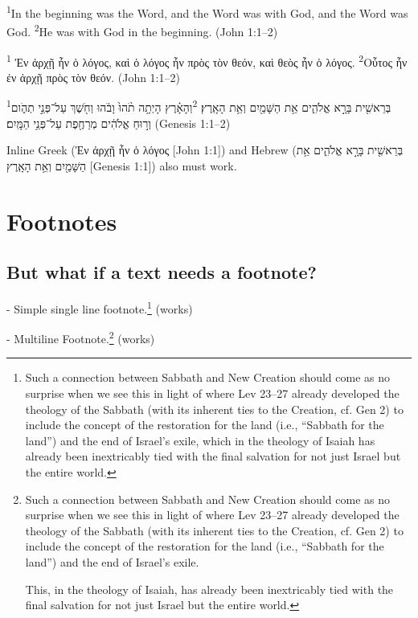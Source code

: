 \documentclass{article}
\begin{document}
	
	\textsuperscript{1}In the beginning was the Word, and the Word was with God,
	and the Word was God. \textsuperscript{2}He was with God in the beginning.
	(John 1:1–2)
	
	
	\textsuperscript{1} Ἐν ἀρχῇ ἦν ὁ λόγος, καὶ ὁ λόγος ἦν πρὸς τὸν θεόν, καὶ θεὸς
	ἦν ὁ λόγος. \textsuperscript{2}Οὗτος ἦν ἐν ἀρχῇ πρὸς τὸν θεόν.
	\foreignlanguage{british}{(John 1:1–2)}
	
	
	\textsuperscript{1}בְּרֵאשִׁ֖ית בָּרָ֣א אֱלֹהִ֑ים אֵ֥ת הַשָּׁמַ֖יִם וְאֵ֥ת הָאָֽרֶץ׃
	\textsuperscript{2}וְהָאָ֗רֶץ הָיְתָ֥ה תֹ֨הוּ֙ וָבֹ֔הוּ וְחֹ֖שֶׁךְ עַל־פְּנֵ֣י תְהֹ֑ום וְר֣וּחַ אֱלֹהִ֔ים מְרַחֶ֖פֶת
	עַל־פְּנֵ֥י הַמָּֽיִם׃ \foreignlanguage{british}{(Genesis 1:1–2)}
	
	
	Inline Greek (\foreignlanguage{polutonikogreek}{Ἐν ἀρχῇ ἦν ὁ λόγος} [John 1:1]) and
	Hebrew (\foreignlanguage{hebrew}{בְּרֵאשִׁ֖ית בָּרָ֣א אֱלֹהִ֑ים אֵ֥ת הַשָּׁמַ֖יִם וְאֵ֥ת הָאָֽרֶץ} [Genesis 1:1]) also must work.

\section{Footnotes}

\subsection{But what if a text needs a footnote?}

- Simple single line footnote.\footnote{
	Such a connection between Sabbath and New Creation should come as no surprise when we see this in light of where Lev 23--27 already developed the theology of the Sabbath (with its inherent ties to the Creation, cf. Gen 2) to include the concept of the restoration for the land (i.e., ``Sabbath for the land'') and the end of Israel's exile, which in the theology of Isaiah has already been inextricably tied with the final salvation for not just Israel but the entire world.} (works)
	
- Multiline Footnote.\footnote{
	Such a connection between Sabbath and New Creation should come as no surprise when we see this in light of where Lev 23--27 already developed the theology of the Sabbath (with its inherent ties to the Creation, cf. Gen 2) to include the concept of the restoration for the land (i.e., ``Sabbath for the land'') and the end of Israel's exile. 
	
	This, in the theology of Isaiah, has already been inextricably tied with the final salvation for not just Israel but the entire world.} (works)
	
\end{document}
